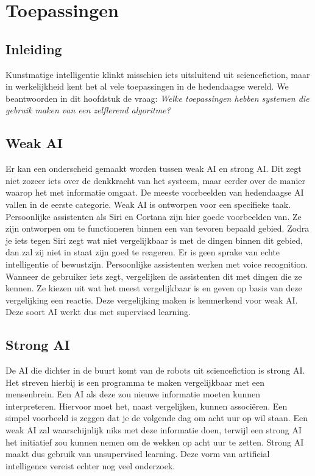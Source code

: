 \section{Toepassingen}

\subsection{Inleiding}
Kunstmatige intelligentie klinkt misschien iets uitsluitend uit sciencefiction, maar in werkelijkheid kent het al vele toepassingen in de hedendaagse wereld. We beantwoorden in dit hoofdstuk de vraag: \textit{Welke toepassingen hebben systemen die gebruik maken van een zelflerend algoritme?}

\subsection{Weak AI}
Er kan een onderscheid gemaakt worden tussen weak AI en strong AI. Dit zegt niet zozeer iets over de denkkracht van het systeem, maar eerder over de manier waarop het met informatie omgaat.
De meeste voorbeelden van hedendaagse AI vallen in de eerste categorie. Weak AI is ontworpen voor een specifieke taak. Persoonlijke assistenten als Siri en Cortana zijn hier goede voorbeelden van. Ze zijn ontworpen om te functioneren binnen een van tevoren bepaald gebied. Zodra je iets tegen Siri zegt wat niet vergelijkbaar is met de dingen binnen dit gebied, dan zal zij niet in staat zijn goed te reageren. Er is geen sprake van echte intelligentie of bewustzijn.
Persoonlijke assistenten werken met voice recognition. Wanneer de gebruiker iets zegt, vergelijken de assistenten dit met dingen die ze kennen. Ze kiezen uit wat het meest vergelijkbaar is en geven op basis van deze vergelijking een reactie. Deze vergelijking maken is kenmerkend voor weak AI. Deze soort AI werkt dus met supervised learning.

\subsection{Strong AI}
De AI die dichter in de buurt komt van de robots uit sciencefiction is strong AI. Het streven hierbij is een programma te maken vergelijkbaar met een mensenbrein. \cite{Searle} Een AI als deze zou nieuwe informatie moeten kunnen interpreteren. Hiervoor moet het, naast vergelijken, kunnen associëren. Een simpel voorbeeld is zeggen dat je de volgende dag om acht uur op wil staan. Een weak AI zal waarschijnlijk niks met deze informatie doen, terwijl een strong AI het initiatief zou kunnen nemen om de wekken op acht uur te zetten. Strong AI maakt dus gebruik van unsupervised learning.
Deze vorm van artificial intelligence vereist echter nog veel onderzoek.

